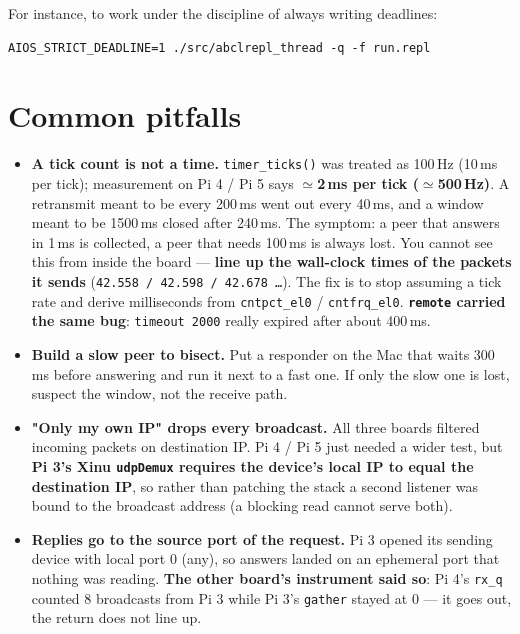\documentclass[11pt,a4paper]{article}
\begin{document}
\noindent For instance, to work under the discipline of always writing deadlines:

\begin{lstlisting}
AIOS_STRICT_DEADLINE=1 ./src/abclrepl_thread -q -f run.repl
\end{lstlisting}

\section{Common pitfalls}

\begin{itemize}
\item \textbf{A tick count is not a time.} \texttt{timer\_ticks()} was treated
  as 100\,Hz (10\,ms per tick); measurement on Pi 4 / Pi 5 says
  \textbf{$\simeq$2\,ms per tick ($\simeq$500\,Hz)}. A retransmit meant to be
  every 200\,ms went out every 40\,ms, and a window meant to be 1500\,ms closed
  after 240\,ms. The symptom: a peer that answers in 1\,ms is collected, a peer
  that needs 100\,ms is always lost. You cannot see this from inside the board
  --- \textbf{line up the wall-clock times of the packets it sends}
  (\texttt{42.558 / 42.598 / 42.678 \ldots}). The fix is to stop assuming a tick
  rate and derive milliseconds from \texttt{cntpct\_el0} / \texttt{cntfrq\_el0}.
  \textbf{\texttt{remote} carried the same bug}: \texttt{timeout 2000} really
  expired after about 400\,ms.
\item \textbf{Build a slow peer to bisect.} Put a responder on the Mac that
  waits 300\,ms before answering and run it next to a fast one. If only the slow
  one is lost, suspect the window, not the receive path.
\item \textbf{"Only my own IP" drops every broadcast.} All three boards filtered
  incoming packets on destination IP. Pi 4 / Pi 5 just needed a wider test, but
  \textbf{Pi 3's Xinu \texttt{udpDemux} requires the device's local IP to equal
  the destination IP}, so rather than patching the stack a second listener was
  bound to the broadcast address (a blocking read cannot serve both).
\item \textbf{Replies go to the source port of the request.} Pi 3 opened its
  sending device with local port 0 (any), so answers landed on an ephemeral port
  that nothing was reading. \textbf{The other board's instrument said so}: Pi 4's
  \texttt{rx\_q} counted 8 broadcasts from Pi 3 while Pi 3's \texttt{gather}
  stayed at 0 --- it goes out, the return does not line up.
\end{itemize}
\end{document}
